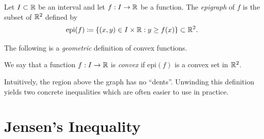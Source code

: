 \documentclass[../analysis1.tex]{subfiles}
\begin{document}
\vspace{1em}

\begin{definition}[Epigraph]
    \begin{shaded*}
        Let $I\subset\mathbb{R}$ be an interval and let $f:I\to\mathbb{R}$ be a function. The \textit{epigraph} of $f$ is the subset of $\mathbb{R}^2$ defined by
        \[\mathrm{epi}(f)\coloneqq \{(x,y)\in I\times \mathbb{R} : y \ge f(x)\}\subset \mathbb{R}^2.\]
    \end{shaded*}
\end{definition}
The following is a \textit{geometric} definition of convex functions.
\begin{definition}
\label{def:epigraphconvex}
    \begin{shaded*}
        We say that a function $f:I\to\mathbb{R}$ is \textit{convex} if $\mathrm{epi}(f)$ is a convex set in $\mathbb{R}^2$.
    \end{shaded*}
\end{definition}

Intuitively, the region above the graph has no ``dents''. Unwinding this definition yields two concrete inequalities which are often easier to use in practice.

\section{Jensen's Inequality}
\end{document}
